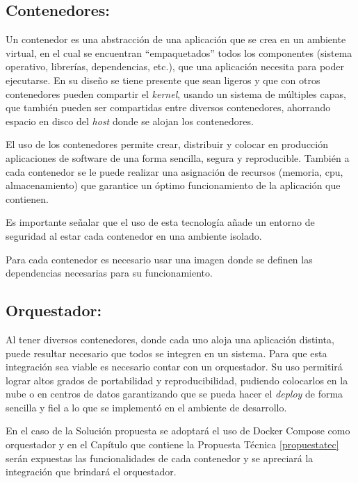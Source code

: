 \documentclass[
  10,
  openany]{book}
\begin{document}
\hypertarget{contenedores}{%
\subsection{Contenedores:}\label{contenedores}}

Un contenedor es una abstracción de una aplicación que se crea en un ambiente virtual, en el cual se encuentran ``empaquetados'' todos los componentes (sistema operativo, librerías, dependencias, etc.), que una aplicación necesita para poder ejecutarse. En su diseño se tiene presente que sean ligeros y que con otros contenedores pueden compartir el \emph{kernel}, usando un sistema de múltiples capas, que también pueden ser compartidas entre diversos contenedores, ahorrando espacio en disco del \emph{host} donde se alojan los contenedores.

El uso de los contenedores permite crear, distribuir y colocar en producción aplicaciones de software de una forma sencilla, segura y reproducible. También a cada contenedor se le puede realizar una asignación de recursos (memoria, cpu, almacenamiento) que garantice un óptimo funcionamiento de la aplicación que contienen.

Es importante señalar que el uso de esta tecnología añade un entorno de seguridad al estar cada contenedor en una ambiente isolado.

Para cada contenedor es necesario usar una imagen donde se definen las dependencias necesarias para su funcionamiento.

\hypertarget{orquestador}{%
\subsection{Orquestador:}\label{orquestador}}

Al tener diversos contenedores, donde cada uno aloja una aplicación distinta, puede resultar necesario que todos se integren en un sistema. Para que esta integración sea viable es necesario contar con un orquestador. Su uso permitirá lograr altos grados de portabilidad y reproducibilidad, pudiendo colocarlos en la nube o en centros de datos garantizando que se pueda hacer el \emph{deploy} de forma sencilla y fiel a lo que se implementó en el ambiente de desarrollo.

En el caso de la Solución propuesta se adoptará el uso de Docker Compose como orquestador y en el Capítulo que contiene la Propuesta Técnica \ref{propuestatec} serán expuestas las funcionalidades de cada contenedor y se apreciará la integración que brindará el orquestador.
\end{document}
